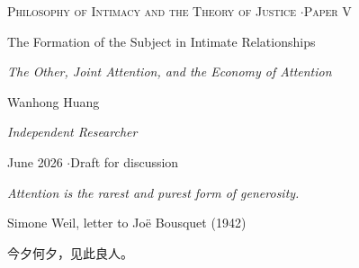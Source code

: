 \documentclass[11pt,a4paper]{article}
\title{}
\date{}
\newcommand{\zh}[1]{{\cjkfont #1}}
\theoremstyle{seriesthm}
\begin{document}
\begin{titlepage}
\thispagestyle{empty}
\vspace*{1.8cm}
\begin{center}
{\footnotesize\color{rosedeep}\scshape Philosophy of Intimacy and the Theory of Justice \quad$\cdot$\quad Paper V\par}
\vspace{0.7cm}
\coverrule\par
\vspace{1.1cm}
{\LARGE\color{warnred} The Formation of the Subject in Intimate Relationships\par}
\vspace{0.5cm}
{\large\color{warnred}\itshape The Other, Joint Attention, and the Economy of Attention\par}
\vspace{1.4cm}
\coverrule[0.25]\par
\vspace{1.0cm}
{\normalsize Wanhong Huang\par}
{\footnotesize\color{lightgold}\itshape Independent Researcher\par}
\vspace{0.6cm}
{\footnotesize June 2026 \quad$\cdot$\quad Draft for discussion\par}
\vspace{2.2cm}

\begin{minipage}{0.78\textwidth}
\centering
{\small\itshape Attention is the rarest and purest form of generosity.\par}
{\footnotesize\color{lightgold}Simone Weil, letter to Jo\"e Bousquet (1942)\par}
\vspace{0.8em}
{\small\zh{今夕何夕，见此良人。}\par}
{\footnotesize\color{lightgold}\zh{《诗经·唐风·绸缪》}\par}
\end{minipage}
\end{center}
\vfill
\coverfootnote
\clearpage


\end{titlepage}
\end{document}
